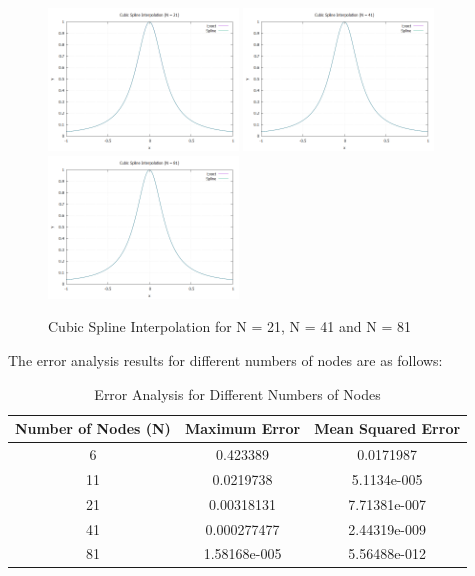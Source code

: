 \documentclass{article}
\begin{document}
\begin{figure}[H]
    \centering
    \includegraphics[width=0.45\textwidth]{../figure/cubic_spline_plot_N21.png}
    \includegraphics[width=0.45\textwidth]{../figure/cubic_spline_plot_N41.png}
    \includegraphics[width=0.45\textwidth]{../figure/cubic_spline_plot_N81.png}
    \caption{Cubic Spline Interpolation for N = 21, N = 41 and N = 81}
    \label{fig:N21}
\end{figure}

The error analysis results for different numbers of nodes are as follows:

\begin{table}[H]
\centering
\begin{tabular}{|c|c|c|}
\hline
Number of Nodes (N) & Maximum Error & Mean Squared Error \\ \hline
6 & 0.423389 & 0.0171987 \\ \hline
11 & 0.0219738 & 5.1134e-005 \\ \hline
21 & 0.00318131 & 7.71381e-007 \\ \hline
41 & 0.000277477 & 2.44319e-009 \\ \hline
81 & 1.58168e-005 & 5.56488e-012 \\ \hline
\end{tabular}
\caption{Error Analysis for Different Numbers of Nodes}
\label{tab:error_analysis}
\end{table}
\end{document}
